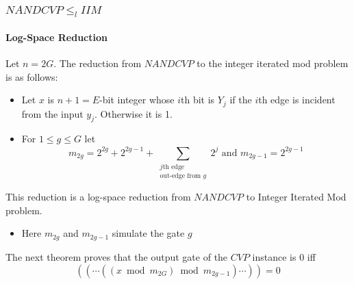 \documentclass[article,8pt]{beamer}%
\begin{document}
\begin{frame}

\frametitle{$NANDCVP\leq_l IIM$}
\framesubtitle{Log-Space Reduction}
Let $n=2G$. The reduction from $NANDCVP$ to the integer iterated mod problem is as follows:\begin{itemize}
	\item Let $x$ is $n+1=E$-bit integer whose $i$th bit is $Y_j$ if the $i$th edge is incident from the input $y_j$. Otherwise it is 1.
	\item For $1\leq g\leq G$ let $$m_{2g}=2^{2g}+2^{2g-1}+\sum_{\substack{j\text{th edge}\\ \text{out-edge from }g}}2^j\text{ and }m_{2g-1}=2^{2g-1}$$
\end{itemize}
This reduction is a log-space reduction from $NANDCVP$ to Integer Iterated Mod problem. 
\begin{itemize}
	\item Here $m_{2g}$ and $m_{2g-1}$ simulate the gate $g$
\end{itemize}
The next theorem proves that the output gate of the $CVP$ instance is 0 iff $$((\cdots ((x\bmod{m_{2G}})\bmod{m_{2g-1}})\cdots))=0$$
\end{frame}
\end{document}
